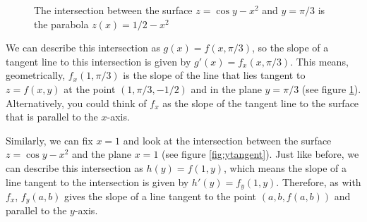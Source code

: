 \begin{figure}[H]
    \centering
    \caption{The intersection between the surface $z = \cos{y} - x^2$ and $y = 
    \pi/3$ is the parabola $z(x) = 1/2 - x^2$}
    \label{fig:tangent-partial_derivatives}
\end{figure}

We can describe this intersection as $g(x) = f(x, \pi/3)$, so the 
slope of a tangent line to this intersection is given by $g'(x) = f_x(x, 
\pi/3)$. This means, geometrically, $f_x(1, \pi/3)$ is the slope of the line 
that lies tangent to $z = f(x, y)$ at the point $(1, \pi/3, -1/2)$ and in the 
plane $y = \pi/3$ (see figure \ref{fig:tangent-partial_derivatives}). Alternatively, you could 
think of $f_x$ as the slope of the tangent line to the surface that is 
parallel to the $x$-axis. 

Similarly, we can fix $x = 1$ and look at the intersection between the surface 
$z = \cos{y} - x^2$ and the plane $x = 1$ (see figure \ref{fig:ytangent}). 
Just like before, we can describe this intersection as $h(y) = f(1, y)$, which 
means the slope of a line tangent to the intersection is given by $h'(y) = 
f_{y}(1, y)$. Therefore, as with $f_x$, $f_y(a, b)$ gives the slope of a line 
tangent to the point $\left(a, b, f(a, b) \right)$ and parallel to the $y$-axis. 

